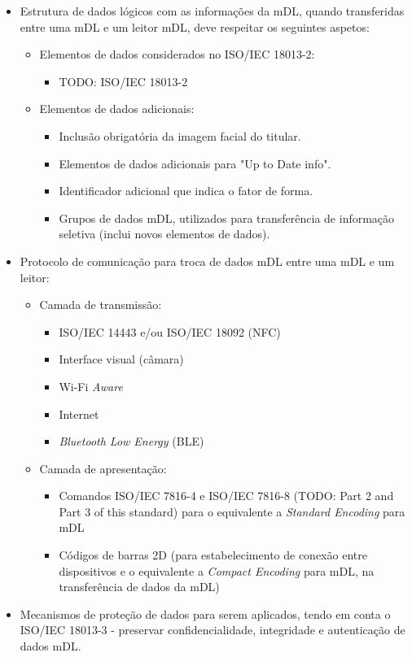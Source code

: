 \begin{itemize}
	\item Estrutura de dados lógicos com as informações da mDL, quando transferidas entre uma mDL e um leitor mDL, deve respeitar os seguintes aspetos:
	\begin{itemize}
		\item Elementos de dados considerados no ISO/IEC 18013-2:
		\begin{itemize}
			\item TODO: ISO/IEC 18013-2
		\end{itemize}

		\item Elementos de dados adicionais:
		\begin{itemize}
			\item Inclusão obrigatória da imagem facial do titular.
			\item Elementos de dados adicionais para "Up to Date info".
			\item Identificador adicional que indica o fator de forma.
			\item Grupos de dados mDL, utilizados para transferência de informação seletiva (inclui novos elementos de dados).
		\end{itemize}
	\end{itemize}

	\item Protocolo de comunicação para troca de dados mDL entre uma mDL e um leitor:
	\begin{itemize}
		\item Camada de transmissão:
		\begin{itemize}
			\item ISO/IEC 14443 e/ou ISO/IEC 18092 (NFC)
			\item Interface visual (câmara)
			\item Wi-Fi \textit{Aware}
			\item Internet
			\item \textit{Bluetooth Low Energy} (BLE)
		\end{itemize}
		\item Camada de apresentação:
		\begin{itemize}
			\item Comandos ISO/IEC 7816-4 e ISO/IEC 7816-8 (TODO: Part 2 and Part 3 of this standard) para o equivalente a \textit{Standard Encoding} para mDL
			\item Códigos de barras 2D (para estabelecimento de conexão entre dispositivos e o equivalente a \textit{Compact Encoding} para mDL, na transferência de dados da mDL)
		\end{itemize}
	\end{itemize}

	\item Mecanismos de proteção de dados para serem aplicados, tendo em conta o ISO/IEC 18013-3 - preservar confidencialidade, integridade e autenticação de dados mDL.
\end{itemize}


